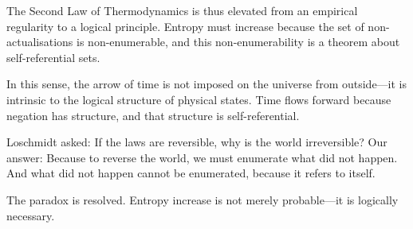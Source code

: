 \documentclass[twocolumn,10pt]{article}
\theoremstyle{definition}
\theoremstyle{remark}
\begin{document}
The Second Law of Thermodynamics is thus elevated from an empirical regularity to a logical principle. Entropy must increase because the set of non-actualisations is non-enumerable, and this non-enumerability is a theorem about self-referential sets.

In this sense, the arrow of time is not imposed on the universe from outside—it is intrinsic to the logical structure of physical states. Time flows forward because negation has structure, and that structure is self-referential.

Loschmidt asked: If the laws are reversible, why is the world irreversible? Our answer: Because to reverse the world, we must enumerate what did not happen. And what did not happen cannot be enumerated, because it refers to itself.

The paradox is resolved. Entropy increase is not merely probable—it is logically necessary.
\end{document}
